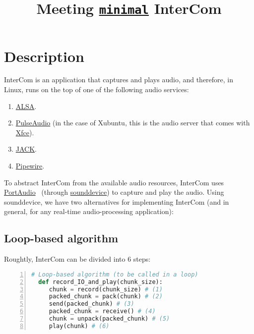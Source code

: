 
\title{Meeting \href{https://github.com/Tecnologias-multimedia/InterCom/blob/master/src/minimal.py}{\texttt{minimal}} InterCom}

\maketitle
\tableofcontents

\section{Description}

InterCom is an application that captures and plays audio, and
therefore, in Linux, runs on the top of one of the following audio
services:
\begin{enumerate}
\item \href{https://vicente-gonzalez-ruiz.github.io/ALSA/}{ALSA}.
\item
  \href{https://vicente-gonzalez-ruiz.github.io/PulseAudio/}{PulseAudio}
  (in the case of Xubuntu, this is the audio server that comes with
  \href{https://www.xfce.org/}{Xfce}).
\item \href{https://vicente-gonzalez-ruiz.github.io/JACK/}{JACK}.
\item \href{https://pipewire.org/}{Pipewire}.
\end{enumerate}

To abstract InterCom from the available audio resources, InterCom uses
\href{http://www.portaudio.com/}{PortAudio}~\cite{portaudio} (through
\href{https://vicente-gonzalez-ruiz.github.io/intro_to_sounddevice/}{sounddevice})
to capture and play the audio. Using sounddevice, we have two
alternatives for implementing InterCom (and in general, for any
real-time audio-processing application):

\subsection{Loop-based algorithm}

Roughtly, InterCom can be divided into 6 steps:

\begin{lstlisting}[language=Python,numbers=left]
  # Loop-based algorithm (to be called in a loop)
  def record_IO_and_play(chunk_size):
     chunk = record(chunk_size) # (1)
     packed_chunk = pack(chunk) # (2)
     send(packed_chunk) # (3)
     packed_chunk = receive() # (4)
     chunk = unpack(packed_chunk) # (5)
     play(chunk) # (6)
\end{lstlisting}

